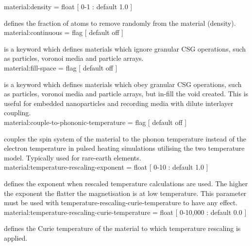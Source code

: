 {\zicf material:density = float [ 0-1 : default 1.0 ]} defines the fraction of atoms to remove randomly from the material (density).\\

{\zicf material:continuous = flag [ default off ]} is a keyword which defines materials which ignore granular CSG operations, such as particles, voronoi media and particle arrays.\\

{\zicf material:fill-space = flag [ default off ]} is a keyword which defines materials which obey granular CSG operations, such as particles, voronoi media and particle arrays, but in-fill the void created. This is useful for embedded nanoparticles and recording media with dilute interlayer coupling.\\

{\zicf material:couple-to-phononic-temperature = flag [ default off ]} couples the spin system of the material to the phonon temperature instead of the electron temperature in pulsed heating simulations utilising the two temperature model. Typically used for rare-earth elements.\\

{\zicf material:temperature-rescaling-exponent = float [ 0-10 : default 1.0 ]} defines the exponent when rescaled temperature calculations are used. The higher the exponent the flatter the magnetisation is at low temperature. This parameter must be used with temperature-rescaling-curie-temperature to have any effect.\\

{\zicf material:temperature-rescaling-curie-temperature = float [ 0-10,000 : default 0.0 ]} defines the Curie temperature of the material to which temperature rescaling is applied.
  

